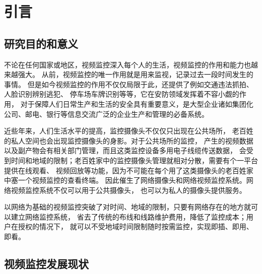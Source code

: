 \chapter{引言}
\section{研究目的和意义}
不论在任何国家或地区，视频监控深入每个人的生活，视频监控的作用和能力也越来越强大。
从前，视频监控的唯一作用就是用来监视，记录过去一段时间发生的事情。
但是如今视频监控的作用不仅仅局限于此，还提供了例如交通违法抓拍、人脸识别辨别逃犯、
停车场车牌识别等等，它在安防领域发挥着不容小觑的作用，
对于保障人们日常生产和生活的安全具有重要意义，是大型企业诸如集团化公司、邮电、银行等信息交流广泛的企业生产和管理的必备系统。

近些年来，人们生活水平的提高，监控摄像头不仅仅只出现在公共场所，
老百姓的私人空间也会出现监控摄像头的身影。对于公共场所的监控，
产生的视频数据以及副产物会有相关部门管理，而且这类监控设备多用电子线缆传送数据，
会受到时间和地域的限制；老百姓家中的监控摄像头管理就相对分散，需要有个一平台提供在线观看、
视频回放等功能，因为不可能在每个用了这类摄像头的老百姓家中塞一个视频监控的查看终端。
因此催生了网络摄像头和网络视频监控系统。网络视频监控系统不仅可以用于公共摄像头，
也可以为私人的摄像头提供服务。

以网络为基础的视频监控突破了对时间、地域的限制，只要有网络存在的地方就可以建立网络监控系统，
省去了传统的布线和线路维护费用，降低了监控成本；用户在授权的情况下，
就可以不受地域时间限制随时按需监控，实现即插、即用、即看。





\section{视频监控发展现状}

